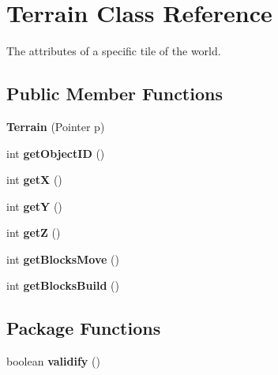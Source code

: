 \hypertarget{classTerrain}{
\section{Terrain Class Reference}
\label{classTerrain}
}
The attributes of a specific tile of the world.  


\subsection*{Public Member Functions}
\begin{CompactItemize}
\item 
\hypertarget{classTerrain_0d2ee6016e8936330580bc005bcfc622}{
\textbf{Terrain} (Pointer p)}
\label{classTerrain_0d2ee6016e8936330580bc005bcfc622}

\item 
\hypertarget{classTerrain_0913a59eb8e865cbdb32c4e188af3983}{
int \textbf{getObjectID} ()}
\label{classTerrain_0913a59eb8e865cbdb32c4e188af3983}

\item 
\hypertarget{classTerrain_1b33d2bcc241700339dd216428a3d727}{
int \textbf{getX} ()}
\label{classTerrain_1b33d2bcc241700339dd216428a3d727}

\item 
\hypertarget{classTerrain_2eb1ec4369bdbf25debb826155ea856c}{
int \textbf{getY} ()}
\label{classTerrain_2eb1ec4369bdbf25debb826155ea856c}

\item 
\hypertarget{classTerrain_0fed449ac13c17ded817b4ca080bac9f}{
int \textbf{getZ} ()}
\label{classTerrain_0fed449ac13c17ded817b4ca080bac9f}

\item 
\hypertarget{classTerrain_51675a9a41da40e321935934f1237d4c}{
int \textbf{getBlocksMove} ()}
\label{classTerrain_51675a9a41da40e321935934f1237d4c}

\item 
\hypertarget{classTerrain_a60618e04ae566314b9ce7697f539152}{
int \textbf{getBlocksBuild} ()}
\label{classTerrain_a60618e04ae566314b9ce7697f539152}

\end{CompactItemize}
\subsection*{Package Functions}
\begin{CompactItemize}
\item 
\hypertarget{classTerrain_883d295b9194940c82e504b8641f6ce5}{
boolean \textbf{validify} ()}
\label{classTerrain_883d295b9194940c82e504b8641f6ce5}

\end{CompactItemize}
